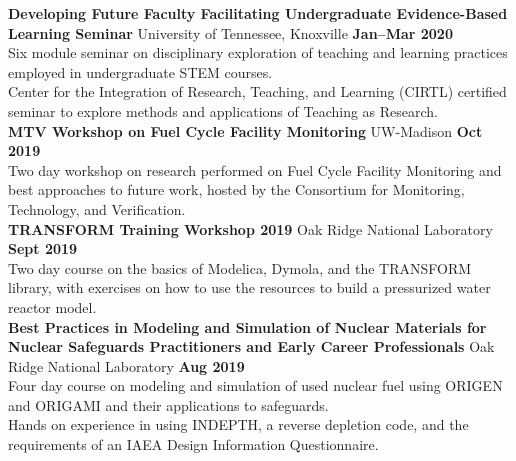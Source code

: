 \documentclass[margin,line]{resume}
\begin{document}
\begin{resume}
    \textbf{Developing Future Faculty Facilitating Undergraduate Evidence-Based Learning Seminar} 
    University of Tennessee, Knoxville \hfill \textbf{Jan--Mar 2020} \\
    Six module seminar on disciplinary exploration of teaching and learning practices employed in undergraduate STEM courses. \\
    Center for the Integration of Research, Teaching, and Learning (CIRTL) certified seminar to explore methods and applications of Teaching as Research.\\
    \textbf{MTV Workshop on Fuel Cycle Facility Monitoring} 
    UW-Madison \hfill \textbf{Oct 2019} \\
    Two day workshop on research performed on Fuel Cycle Facility Monitoring and best approaches to future work, hosted by the Consortium for Monitoring, Technology, and Verification. \\
    \textbf{TRANSFORM Training Workshop 2019} 
    Oak Ridge National Laboratory \hfill \textbf{Sept 2019} \\
    Two day course on the basics of Modelica, Dymola, and the TRANSFORM library, with exercises on how to use the resources to build a pressurized water reactor model. \\
    \textbf{Best Practices in Modeling and Simulation of Nuclear Materials for Nuclear Safeguards Practitioners and Early Career Professionals} 
    Oak Ridge National Laboratory \hfill \textbf{Aug 2019} \\
    Four day course on modeling and simulation of used nuclear fuel using ORIGEN and ORIGAMI and their applications to safeguards. \\
    Hands on experience in using INDEPTH, a reverse depletion code, and the requirements of an IAEA Design Information Questionnaire. 
    





\end{resume}
\end{document}

